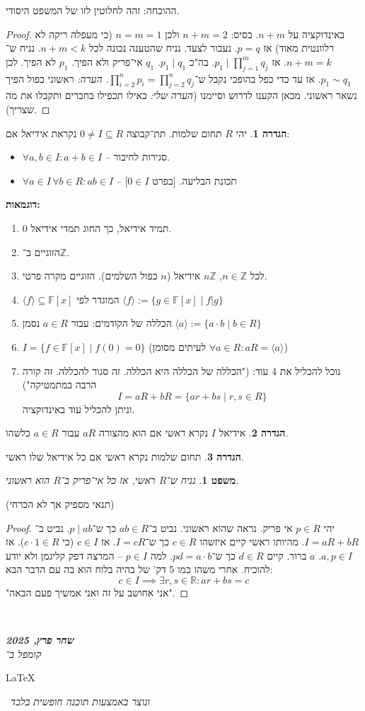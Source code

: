 \documentclass[]{article}
\newcommand\en[1] {\begin{otherlanguage}{english}#1\end{otherlanguage}}
\newcommand\ndoc  {\dotfill \\ \vfil {\begin{center}
			{\textbf{\textit{שחר פרץ, 2025}} \\
				\scriptsize \textit{קומפל ב־}\en{\LaTeX}\,\textit{ ונוצר באמצעות תוכנה חופשית בלבד}}
	\end{center}} \vfil	}
\newcommand\Z     {\mathbb{Z}}
\newcommand\R     {\mathbb{R}}
\newcommand\ra    {\rangle}
\newcommand\la    {\langle}
\newcommand\F         {\mathbb{F}}
\newcommand\co        {\colon}
\newtheorem{Theorem}{משפט}
\theoremstyle{definition}
\newtheorem{definition}{הגדרה}
\newcommand\theo  [1] {\begin{Theorem}#1\end{Theorem}}
\newcommand\defi  [1] {\begin{definition}#1\end{definition}}
\begin{document}
	ההוכחה: זהה לחלוטין לזו של המשפט היסודי. \begin{proof}
		באינדוקציה על $n+m$. בסיס: $n + m = 2$ ולכן $n = m = 1$ (כי מעפלה ריקה לא רלוונטית מאוד) אז $p = q$. נעבור לצעד. נניח שהטענה נכונה לכל $n + m < k$. נניח ש־$n + m = k$. אז $p_1 \mid \prod_{j = 1}^{m}q_j$. בה"כ $p_1 \mid q_1$. $q_1$ אי־פריק ולא הפיך. $p_1$ לא הפיך. לכן $p_1 \sim q_1$. אז עד כדי כפל בהופכי נקבל ש־$\prod_{i = 2}^{n} p_i = \prod_{j = 2}^{n} q_j$. \textit{הערה: }ראשוני כפול הפיך נשאר ראשוני. מכאן הקענו לדרוש וסיימנו (\textit{הערה שלי: }כאילו תכפילו בחברים ותקבלו את מה שצריך). 
	\end{proof}
	
	\defi{יהי $R$ תחום שלמות. תת־קבוצה $0 \neq I \subseteq R$ נקראת \textit{אידיאל} אם: 
	\begin{itemize}[A.]
		\item $\forall a, b \in I \co a + b \in I$ – סגירות לחיבור. 
		\item $\forall a \in I \, \forall b \in R \co ab \in I$ – תכונת הבליעה. [בפרט $0 \in I$]
	\end{itemize}}
	\textbf{דוגמאות: }\begin{enumerate}
		\item $0$ תמיד אידיאל, כך החוג תמדי אידיאל. 
		\item הזוגיים ב־$\Z$. 
		\item לכל $n \in \Z$, $n\Z$ אידיאל ($n$ כפול השלמים). הזוגיים מקרה פרטי. 
		\item $\la f \ra \subseteq \F[x]$ המוגדר לפי $\la f \ra := \{g \in \F[x] \mid f|g\}$
		\item הכללה של הקודמים: עבור $a \in R$ נסמן $\la a \ra := \{a \cdot b \mid b \in R\}$
		\item $I = \{f \in \F[x] \mid f(0) = 0\}$ (לעיתים מסומן $\forall a \in R \co aR = \la a \ra$)
		\item נוכל להכליל את 4 עוד: ("הכללה של הכללה היא הכללה. זה סגור להכללה. זה קורה הרבה במתמטיקה")
		\[ I = aR + bR = \{ar + bs \mid r, s \in R\} \]
		וניתן להכליל עוד באינדוקציה. 
	\end{enumerate}
	\defi{אידיאל $I$ נקרא \textit{ראשי} אם הוא מהצורה $aR$ עבור $a \in R$ כלשהו. }
	\defi{תחום שלמות נקרא \textit{ראשי} אם כל אידיאל שלו ראשי. }
	\theo{נניח ש־$R$ ראשי, אז כל אי־פריק ב־$R$ הוא ראשוני. }
	(תנאי מספיק אך לא הכרחי)
	
	\begin{proof}
		יהי $p \in R$ אי פריק. נראה שהוא ראשוני. נביט ב־$ab \in R$ כך ש־$p \mid ab$. נביט ב־$I = aR + bR$. מהיותו ראשי קיים איזשהו $c \in R$ כך ש־$I = cR$. אז $c \in I$ (כי $c \cdot 1 \in R$). אז $a, p \in I$. $a$ ברור. קיים $d \in R$ כך ש־$pd = a \cdot b$. למה $p \in I$ – המרצה דפק קליגמן ולא יודע להוכיח. 
		אחרי משהו כמו 5 דק' של בהיה בלוח הוא בה עם הדבר הבא: 
		\[ c \in I \implies \exists r, s \in \R\co ar + bs = c \]
		"אני אחושב על זה ואני אמשיך פעם הבאה". 
	\end{proof}
	
	
	
	\ndoc
\end{document}
